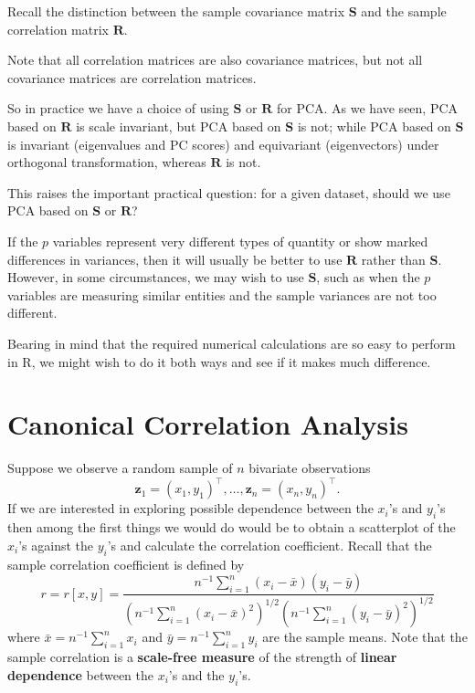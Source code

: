 \documentclass[]{book}
\theoremstyle{definition}
\theoremstyle{definition}
\theoremstyle{definition}
\theoremstyle{remark}
\begin{document}
Recall the distinction between the sample covariance matrix \(\boldsymbol S\) and the sample correlation matrix \(\boldsymbol R\).

Note that all correlation matrices are also covariance matrices, but not all covariance matrices are correlation matrices.

So in practice we have a choice of using \(\boldsymbol S\) or \(\boldsymbol R\) for PCA. As we have seen, PCA based on \(\boldsymbol R\) is scale invariant, but PCA based on \(\boldsymbol S\) is not; while PCA based on \(\boldsymbol S\) is invariant (eigenvalues and PC scores) and equivariant (eigenvectors) under orthogonal transformation, whereas \(\boldsymbol R\) is not.

This raises the important practical question: for a given dataset, should we use PCA based on \(\boldsymbol S\) or \(\boldsymbol R\)?

If the \(p\) variables represent very different types of quantity or show marked differences in variances, then it will usually be better to use \(\boldsymbol R\) rather than \(\boldsymbol S\). However, in some circumstances, we may wish to use \(\boldsymbol S\), such as when the \(p\) variables are measuring similar entities and the sample variances are not too different.

Bearing in mind that the required numerical calculations are so easy to perform in R, we might wish to do it both ways and see if it makes much difference.

\hypertarget{cca}{%
\chapter{Canonical Correlation Analysis}\label{cca}}

Suppose we observe a random sample of \(n\) bivariate observations
\[
\boldsymbol z_1=(x_1,y_1)^\top , \ldots , \boldsymbol z_n=(x_n,y_n)^\top.
\]
If we are interested in exploring possible dependence between the \(x_i\)'s and \(y_i\)'s then among the first things we would do would be to obtain a scatterplot of the \(x_i\)'s against the \(y_i\)'s and calculate the correlation coefficient. Recall that the sample correlation coefficient is defined by
\begin{equation}
r=r[x,y]=\frac{n^{-1}\sum_{i=1}^n (x_i-\bar{x})(y_i-\bar{y})}{\left ( n^{-1}\sum_{i=1}^n (x_i-\bar{x})^2  \right )^{1/2}  \left ( n^{-1}\sum_{i=1}^n (y_i-\bar{y})^2 \right )^{1/2}}
\label{eq:scr}
\end{equation}
where \(\bar{x}=n^{-1}\sum_{i=1}^n x_i\) and \(\bar{y}=n^{-1}\sum_{i=1}^n y_i\) are the sample means. Note that the sample correlation is a \textbf{scale-free measure} of the strength of \textbf{linear dependence} between the \(x_i\)'s and the \(y_i\)'s.
\end{document}
